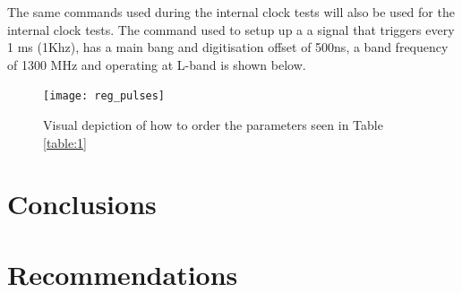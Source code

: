 \documentclass[12pt, a4paper]{article}
\begin{document}
The same commands used during the internal clock tests will also be used for the internal clock tests. The command used to setup up a a signal that triggers every 1 ms (1Khz), has a main bang and digitisation offset of 500ns, a band frequency of 1300 MHz and operating at L-band is shown below. 


	\begin{figure}
		\centering
		\texttt{[image: reg\_pulses]}
		\caption{Visual depiction of how to order the parameters seen in Table \ref{table:1}}
		\label{fig:1khz_sig_ext}
	\end{figure}

\section{Conclusions}

\section{Recommendations}
\end{document}
